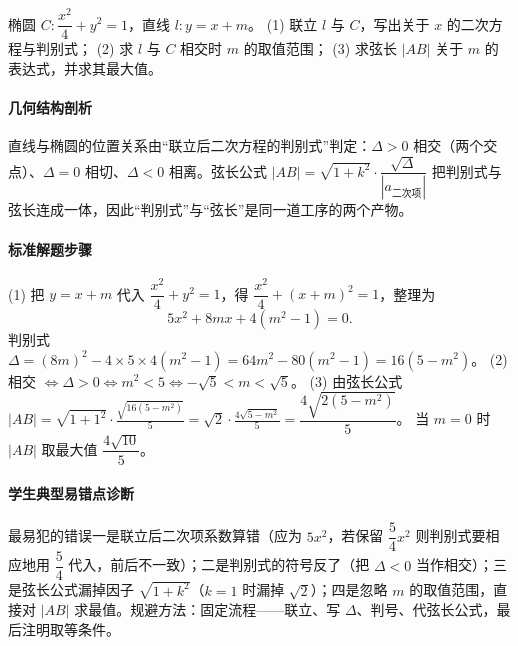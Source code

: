 \begin{problem}
椭圆 $C:\dfrac{x^2}{4}+y^2=1$，直线 $l:y=x+m$。
(1) 联立 $l$ 与 $C$，写出关于 $x$ 的二次方程与判别式；
(2) 求 $l$ 与 $C$ 相交时 $m$ 的取值范围；
(3) 求弦长 $|AB|$ 关于 $m$ 的表达式，并求其最大值。
\end{problem}
\begin{solution}
\paragraph{几何结构剖析}
直线与椭圆的位置关系由“联立后二次方程的判别式”判定：$\Delta>0$ 相交（两个交点）、$\Delta=0$ 相切、$\Delta<0$ 相离。弦长公式 $|AB|=\sqrt{1+k^2}\cdot\dfrac{\sqrt\Delta}{|a_{\text{二次项}}|}$ 把判别式与弦长连成一体，因此“判别式”与“弦长”是同一道工序的两个产物。
\paragraph{标准解题步骤}
(1) 把 $y=x+m$ 代入 $\dfrac{x^2}{4}+y^2=1$，得 $\dfrac{x^2}{4}+(x+m)^2=1$，整理为
$$5x^2+8mx+4(m^2-1)=0.$$
判别式
$\Delta=(8m)^2-4\times5\times4(m^2-1)=64m^2-80(m^2-1)=16(5-m^2)$。
(2) 相交 $\iff\Delta>0\iff m^2<5\iff -\sqrt5<m<\sqrt5$。
(3) 由弦长公式
$|AB|=\sqrt{1+1^2}\cdot\frac{\sqrt{16(5-m^2)}}{5}=\sqrt2\cdot\frac{4\sqrt{5-m^2}}{5}=\dfrac{4\sqrt{2(5-m^2)}}{5}$。
当 $m=0$ 时 $|AB|$ 取最大值 $\dfrac{4\sqrt{10}}5$。
\paragraph{学生典型易错点诊断}
最易犯的错误一是联立后二次项系数算错（应为 $5x^2$，若保留 $\dfrac54x^2$ 则判别式要相应地用 $\dfrac54$ 代入，前后不一致）；二是判别式的符号反了（把 $\Delta<0$ 当作相交）；三是弦长公式漏掉因子 $\sqrt{1+k^2}$（$k=1$ 时漏掉 $\sqrt2$）；四是忽略 $m$ 的取值范围，直接对 $|AB|$ 求最值。规避方法：固定流程——联立、写 $\Delta$、判号、代弦长公式，最后注明取等条件。
\end{solution}

